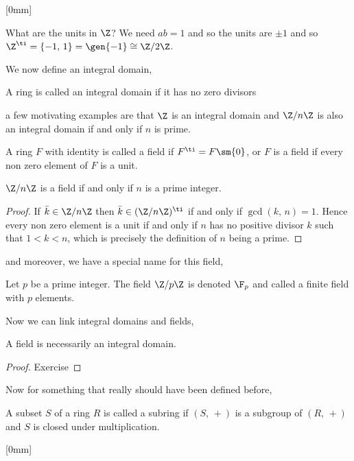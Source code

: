 
[0mm]
\begin{eg}
  What are the units in $\Z$? We need $ab = 1$ and so the units are $\pm 1$ and so $\Z^\ti = \{-1,\,1\} = \gen{-1} \cong \Z/2\Z$.\\
\end{eg}

We now define an integral domain,
\begin{ndefi}
  A ring is called an integral domain if it has no zero divisors
\end{ndefi}

a few motivating examples are that $\Z$ is an integral domain and $\Z/n\Z$ is also an integral domain if and only if $n$ is prime.

\begin{ndefi}[Field]
  A ring $F$ with identity is called a field if $F^\ti = F \sm \{0\}$, or $F$ is a field if every non zero element of $F$ is a unit.
\end{ndefi}

\begin{nlemma}
  $\Z/n\Z$ is a field if and only if $n$ is a prime integer.
\end{nlemma}
\begin{proof}
  If $\bar k \in \Z/n\Z$ then $\bar k \in (\Z/n\Z)^\ti$ if and only if $\gcd(k,\,n)=1$. Hence every non zero element is a unit if and only if $n$ has no positive divisor $k$ such that $1 < k < n$, which is precisely the definition of $n$ being a prime.
\end{proof}

and moreover, we have a special name for this field,
\begin{ndefi}
  Let $p$ be a prime integer. The field $\Z/p\Z$ is denoted $\F_p$ and called a finite field with $p$ elements.
\end{ndefi}

Now we can link integral domains and fields,
\begin{nlemma}
  A field is necessarily an integral domain.
\end{nlemma}
\begin{proof}
  Exercise
\end{proof}

Now for something that really should have been defined before,
\begin{ndefi}[Subring]
  A subset $S$ of a ring $R$ is called a subring if $(S,\,+)$ is a subgroup of $(R,\,+)$ and $S$ is closed under multiplication.
\end{ndefi}[0mm]

